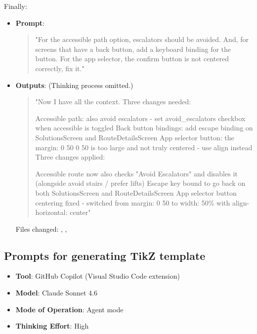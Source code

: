 \documentclass[a4paper,10pt]{amsart}
\begin{document}
Finally:
\begin{itemize}
    \item \textbf{Prompt}:
    \begin{quotation}
        \ttfamily "For the accessible path option, escalators should be avoided.
        And, for screens that have a back button, add a keyboard binding for the button.
        For the app selector, the confirm button is not centered correctly, fix it."
    \end{quotation}
    \item \textbf{Outputs}:
    (Thinking process omitted.)
    \begin{quotation}
        \ttfamily "Now I have all the context.
        Three changes needed:

        Accessible path: also avoid escalators - set avoid\_escalators checkbox when accessible is toggled
        Back button bindings: add escape binding on SolutionsScreen and RouteDetailsScreen
        App selector button: the margin: 0 50 0 50 is too large and not truly centered - use align instead
        Three changes applied:

        Accessible route now also checks "Avoid Escalators" and disables it (alongside avoid stairs / prefer lifts)
        Escape key bound to go back on both SolutionsScreen and RouteDetailsScreen
        App selector button centering fixed - switched from margin: 0 50 to width: 50\% with align-horizontal: center"
    \end{quotation}
    Files changed: , , 
\end{itemize}

\subsection{Prompts for generating TikZ template} \label{adx:tikz-template-prompt}
\begin{itemize}
    \item \textbf{Tool}: GitHub Copilot (Visual Studio Code extension)
    \item \textbf{Model}: Claude Sonnet 4.6
    \item \textbf{Mode of Operation}: Agent mode
    \item \textbf{Thinking Effort}: High
\end{itemize}
\end{document}
